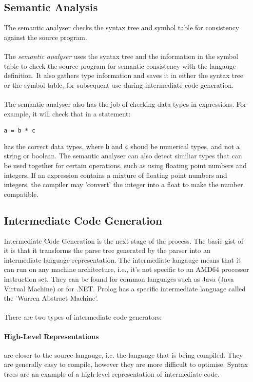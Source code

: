 \documentclass[12pt]{report}
\begin{document}
\subsection{Semantic Analysis}\label{subsec:syntax_trees}
The semantic analyser checks the syntax tree and symbol table for consistency against the source program.\\
\\
The \textit{semantic analyser} uses the syntax tree and the information in the symbol table to check the source program for semantic consistency with the langauge definition.  It also gathers type information and saves it in either the syntax tree or the symbol table, for subsequent use during intermediate-code generation. \citep{compilers07}\\
\\
The semantic analyser also has the job of checking data types in expressions.  For example, it will check that in a statement:\\
\begin{center}
	\texttt{a = b * c}\\
\end{center}
has the correct data types, where \texttt{b} and \texttt{c} shoud be numerical types, and not a string or boolean.  The semantic analyser can also detect similiar types that can be used together for certain operations, such as using floating point numbers and integers.  If an expression contains a mixture of floating point numbers and integers, the compiler may 'convert' the integer into a float to make the number compatible.
\subsection{Intermediate Code Generation}\label{subsec:intermediate_code_gen}
Intermediate Code Generation is the next stage of the process.  The basic gist of it is that it transforms the parse tree generated by the parser into an intermediate language representation.  The intermediate langauge means that it can run on any machine architecture, i.e., it's not specific to an AMD64 processor instruction set.  They can be found for common languages such as Java (Java Virtual Machine) or for .NET.  Prolog has a specific intermediate language called the 'Warren Abstract Machine'.\\
\\
There are two types of intermediate code generators:
\paragraph{High-Level Representations} are closer to the source langauge, i.e. the langauge that is being compiled.  They are generally easy to compile, however they are more difficult to optimise.  Syntax trees are an example of a high-level representation of intermediate code.
\end{document}
